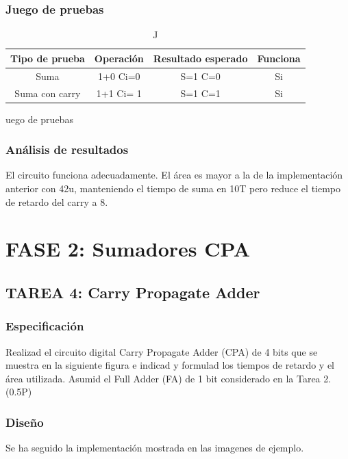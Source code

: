 \documentclass{article}
\begin{document}
		\subsubsection*{Juego de pruebas}
		\begin{table}[h]
			\begin{center}
				\begin{tabular}{| c | c | c | c |}
					\hline
					Tipo de prueba & Operación & Resultado esperado & Funciona \\ \hline
					Suma & 1+0 Ci=0 & S=1 C=0 & Si \\ \hline
					Suma con carry & 1+1 Ci= 1 & S=1 C=1 & Si \\ \hline
			
				\end{tabular}
				\caption Juego de pruebas
			\end{center}
		\end{table}


		\subsubsection*{Análisis de resultados}
		El circuito funciona adecuadamente. El área es mayor a la de la implementación anterior con 42u, manteniendo el tiempo de suma en 10T pero reduce el tiempo de retardo del carry a 8.

\section{FASE 2: Sumadores CPA}
	\subsection{TAREA 4: Carry Propagate Adder}
		\subsubsection*{Especificación}
		Realizad el circuito digital Carry Propagate Adder (CPA) de 4 bits que se muestra en la
		siguiente figura e indicad y formulad los tiempos de retardo y el área utilizada. Asumid el Full
		Adder (FA) de 1 bit considerado en la Tarea 2. (0.5P)


		\subsubsection*{Diseño}
		Se ha seguido la implementación mostrada en las imagenes de ejemplo.
\end{document}
